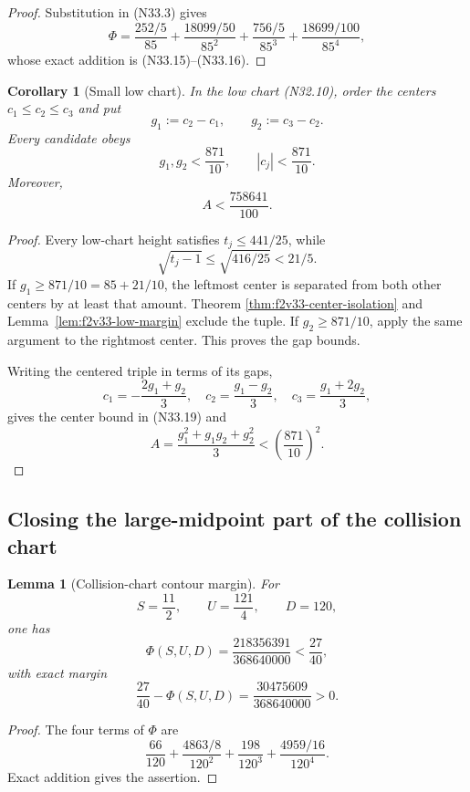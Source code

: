 \documentclass[11pt]{article}
\newtheorem{lemma}[theorem]{Lemma}
\newtheorem{corollary}[theorem]{Corollary}
\theoremstyle{definition}
\theoremstyle{remark}
\begin{document}
\begin{proof}
Substitution in \textup{(N33.3)} gives
\[
 \Phi=
 \frac{252/5}{85}
 +\frac{18099/50}{85^2}
 +\frac{756/5}{85^3}
 +\frac{18699/100}{85^4},
 \tag{N33.17}
\]
whose exact addition is \textup{(N33.15)}--\textup{(N33.16)}.
\end{proof}

\begin{corollary}[Small low chart]
\label{cor:f2v33-small-low}
In the low chart \textup{(N32.10)}, order the centers
\(c_1\leq c_2\leq c_3\) and put
\[
 g_1:=c_2-c_1,\qquad g_2:=c_3-c_2.
 \tag{N33.18}
\]
Every candidate obeys
\[
 \boxed{g_1,g_2<\frac{871}{10},\qquad
 |c_j|<\frac{871}{10}.}
 \tag{N33.19}
\]
Moreover,
\[
 A<\frac{758641}{100}.
 \tag{N33.20}
\]
\end{corollary}

\begin{proof}
Every low-chart height satisfies \(t_j\leq441/25\), while
\[
 \sqrt{t_j-1}\leq\sqrt{416/25}<21/5.
 \tag{N33.21}
\]
If \(g_1\geq871/10=85+21/10\), the leftmost center is separated from
both other centers by at least that amount.  Theorem
\ref{thm:f2v33-center-isolation} and
Lemma~\ref{lem:f2v33-low-margin} exclude the tuple.  If
\(g_2\geq871/10\), apply the same argument to the rightmost center.
This proves the gap bounds.

Writing the centered triple in terms of its gaps,
\[
 c_1=-\frac{2g_1+g_2}{3},\quad
 c_2=\frac{g_1-g_2}{3},\quad
 c_3=\frac{g_1+2g_2}{3},
 \tag{N33.22}
\]
gives the center bound in \textup{(N33.19)} and
\[
 A=\frac{g_1^2+g_1g_2+g_2^2}{3}
 <\left(\frac{871}{10}\right)^2.
 \tag{N33.23}
\]
\end{proof}

\subsection{Closing the large-midpoint part of the collision chart}

\begin{lemma}[Collision-chart contour margin]
\label{lem:f2v33-collision-margin}
For
\[
 S=\frac{11}{2},\qquad U=\frac{121}{4},\qquad D=120,
 \tag{N33.24}
\]
one has
\[
 \Phi(S,U,D)
 =\frac{218356391}{368640000}
 <\frac{27}{40},
 \tag{N33.25}
\]
with exact margin
\[
 \frac{27}{40}-\Phi(S,U,D)
 =\frac{30475609}{368640000}>0.
 \tag{N33.26}
\]
\end{lemma}

\begin{proof}
The four terms of \(\Phi\) are
\[
 \frac{66}{120}
 +\frac{4863/8}{120^2}
 +\frac{198}{120^3}
 +\frac{4959/16}{120^4}.
 \tag{N33.27}
\]
Exact addition gives the assertion.
\end{proof}
\end{document}
